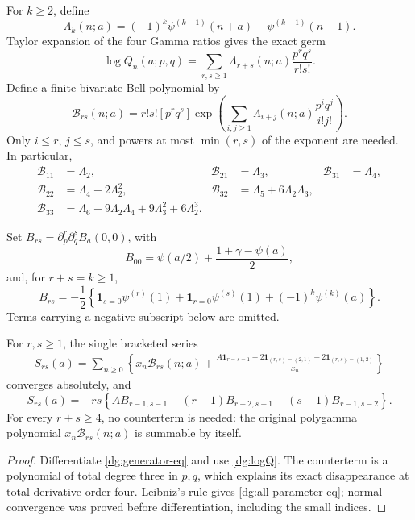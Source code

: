 For $k\geq2$, define
\[
 \Lambda_k(n;a)=(-1)^k\psi^{(k-1)}(n+a)
                                -\psi^{(k-1)}(n+1).
\]
Taylor expansion of the four Gamma ratios gives the exact germ
\begin{equation}
 \log Q_n(a;p,q)=\sum_{r,s\geq1}
       \Lambda_{r+s}(n;a)\frac{p^rq^s}{r!s!}.
 \label{dg:logQ}
\end{equation}
Define a finite bivariate Bell polynomial by
\[
 \mathcal B_{rs}(n;a)=r!s![p^rq^s]
 \exp\left(\sum_{i,j\geq1}
       \Lambda_{i+j}(n;a)\frac{p^iq^j}{i!j!}\right).
\]
Only $i\leq r$, $j\leq s$, and powers at most $\min(r,s)$
of the exponent are needed. In particular,
\begin{align*}
 \mathcal B_{11}&=\Lambda_2,&
 \mathcal B_{21}&=\Lambda_3,&
 \mathcal B_{31}&=\Lambda_4,\\
 \mathcal B_{22}&=\Lambda_4+2\Lambda_2^2,&
 \mathcal B_{32}&=\Lambda_5+6\Lambda_2\Lambda_3,\\
 \mathcal B_{33}&=\Lambda_6+9\Lambda_2\Lambda_4
                            +9\Lambda_3^2+6\Lambda_2^3.
\end{align*}

Set $B_{rs}=\partial_p^r\partial_q^sB_a(0,0)$, with
\[
 B_{00}=\psi(a/2)+\frac{1+\gamma-\psi(a)}2,
\]
and, for $r+s=k\geq1$,
\begin{equation}
 B_{rs}=-\frac12\left\{
 \mathbf1_{s=0}\psi^{(r)}(1)+
 \mathbf1_{r=0}\psi^{(s)}(1)+(-1)^k\psi^{(k)}(a)\right\}.
 \label{dg:B-jets}
\end{equation}
Terms carrying a negative subscript below are omitted.

\begin{corollary}
\label{dg:all-parameter}
For $r,s\geq1$, the single bracketed series
\begin{align}
 S_{rs}(a)=\sum_{n\geq0}\left\{
 x_n\mathcal B_{rs}(n;a)
 +\frac{A\mathbf1_{r=s=1}
  -2\mathbf1_{(r,s)=(2,1)}-2\mathbf1_{(r,s)=(1,2)}}{x_n}
 \right\}
 \label{dg:S}
\end{align}
converges absolutely, and
\begin{equation}
 S_{rs}(a)=-rs\left\{
 A B_{r-1,s-1}-(r-1)B_{r-2,s-1}-(s-1)B_{r-1,s-2}
 \right\}.
 \label{dg:all-parameter-eq}
\end{equation}
For every $r+s\geq4$, no counterterm is needed: the original
polygamma polynomial $x_n\mathcal B_{rs}(n;a)$ is summable by itself.
\end{corollary}
\begin{proof}
Differentiate \eqref{dg:generator-eq} and use
\eqref{dg:logQ}. The counterterm is a polynomial of total
degree three in $p,q$, which explains its exact disappearance at
total derivative order four. Leibniz's rule gives
\eqref{dg:all-parameter-eq}; normal convergence was proved
before differentiation, including the small indices.
\end{proof}

